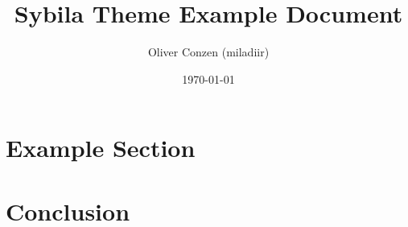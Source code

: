 \documentclass[xcolor=svgnames]{beamer} %
\title{Sybila Theme Example Document}
\author{Oliver Conzen (miladiir)}
\institute{Github Example}
\date{\today}
\begin{document}
\frame[plain]{\titlepage}

\section{Example Section}


\section{Conclusion}

	
\end{document}
